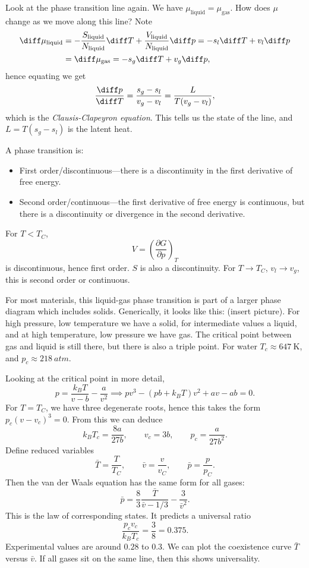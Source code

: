\documentclass[12pt]{article}
\begin{document}
Look at the phase transition line again. We have $\mu_{\mathrm{liquid}}  = \mu_{\mathrm{gas}}$. How does $\mu$ change as we move along this line? Note
\begin{align*}
	\diff \mu_{\mathrm{liquid}} &= - \frac{S_{\mathrm{liquid}}}{N_{\mathrm{liquid}}} \diff T + \frac{V_{\mathrm{liquid}}}{N_{\mathrm{liquid}}} \diff p = - s_l \diff T + v_l \diff p \\
				    &= \diff \mu_{\mathrm{gas}} = - s_g \diff T + v_g \diff p,
\end{align*}
hence equating we get
\[
\frac{\diff p}{\diff T} = \frac{s_g - s_l}{v_g - v_l} = \frac{L}{T(v_g - v_l)},
\]
which is the \emph{Clausis-Clapeyron equation}. This tells us the state of the line, and $L = T(s_g - s_l)$ is the latent heat.

A phase transition is:
\begin{itemize}
	\item First order/discontinuous---there is a discontinuity in the first derivative of free energy.
	\item Second order/continuous---the first derivative of free energy is continuous, but there is a discontinuity or divergence in the second derivative.
\end{itemize}
For $T < T_C$,
\[
V = \left( \frac{\partial G}{\partial p} \right)_T
\]
is discontinuous, hence first order. $S$ is also a discontinuity. For $T \to T_C$, $v_l \to v_g$, this is second order or continuous.

For most materials, this liquid-gas phase transition is part of a larger phase diagram which includes solids. Generically, it looks like this: (insert picture). For high pressure, low temperature we have a solid, for intermediate values a liquid, and at high temperature, low pressure we have gas. The critical point between gas and liquid is still there, but there is also a triple point. For water $T_c \approx \qty{647}{\kelvin}$, and $p_c \approx \qty{218}{atm}$.

Looking at the critical point in more detail,
 \[
p = \frac{k_B T}{v - b} - \frac{a}{v^2} \implies pv^3 - (pb + k_B T)v^2 + av - ab = 0.
\]
For $T = T_C$, we have three degenerate roots, hence this takes the form $p_c(v - v_c)^3 = 0$. From this we can deduce
\[
k_B T_c = \frac{8a}{27b}, \qquad v_c = 3b, \qquad p_c = \frac{a}{27b^2}.
\]
Define reduced variables
\[
\bar T= \frac{T}{T_C}, \qquad \bar v = \frac{v}{v_C}, \qquad \bar p = \frac{p}{p_C}.
\]
Then the van der Waals equation has the same form for all gases:
\[
\bar p = \frac{8}{3} \frac{\bar T}{\bar v - 1/3} - \frac{3}{\bar v^2}.
\]
This is the law of corresponding states. It predicts a universal ratio
\[
\frac{p_cv_c}{k_B T_c} = \frac{3}{8} = 0.375.
\]
Experimental values are around $0.28$ to $0.3$. We can plot the coexistence curve $\bar T$ versus $\bar v$. If all gases sit on the same line, then this shows universality.
\end{document}
